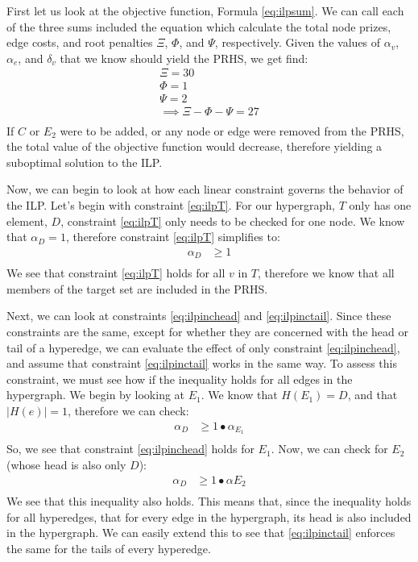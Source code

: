 \documentclass[12pt,twoside]{reedthesis}
\theoremstyle{definition}
\begin{document}
First let us look at the objective function, Formula \eqref{eq:ilpsum}. We can call each of the three sums included the equation which calculate the total node prizes, edge costs, and root penalties $\Xi$, $\Phi$, and $\Psi$, respectively. Given the values of $\alpha_v$, $\alpha_e$, and $\delta_v$ that we know should yield the PRHS, we get find:
\begin{gather*}
 \Xi = 30\\
 \Phi = 1\\
 \Psi = 2\\
 \implies \Xi - \Phi - \Psi = 27\\
\end{gather*}%
If $C$ or $E_2$ were to be added, or any node or edge were removed from the PRHS, the total value of the objective function would decrease, therefore yielding a suboptimal solution to the ILP.\par

Now, we can begin to look at how each linear constraint governs the behavior of the ILP. Let's begin with constraint \eqref{eq:ilpT}. For our hypergraph, $T$ only has one element, $D$, constraint \eqref{eq:ilpT} only needs to be checked for one node. We know that $\alpha_D = 1$, therefore constraint \eqref{eq:ilpT} simplifies to:
\begin{align*}
  \alpha_D &\geq 1\\
\end{align*}
We see that constraint \eqref{eq:ilpT} holds for all $v$ in $T$, therefore we know that all members of the target set are included in the PRHS.\par

Next, we can look at constraints \eqref{eq:ilpinchead} and \eqref{eq:ilpinctail}. Since these constraints are the same, except for whether they are concerned with the head or tail of a hyperedge, we can evaluate the effect of only constraint \eqref{eq:ilpinchead}, and assume that constraint \eqref{eq:ilpinctail} works in the same way. To assess this constraint, we must see how if the inequality holds for all edges in the hypergraph. We begin by looking at $E_1$. We know that $H({E_1})=D$, and that $\lvert H(e) \rvert = 1$, therefore we can check:
\begin{align*}
  \alpha_D &\geq 1 \bullet \alpha_{E_1}\\
\end{align*}%
So, we see that constraint \eqref{eq:ilpinchead} holds for $E_1$. Now, we can check for $E_2$ (whose head is also only $D$):
\begin{align*}
  \alpha_D &\geq 1 \bullet \alpha{E_2}\\
\end{align*}%
We see that this inequality also holds. This means that, since the inequality holds for all hyperedges, that for every edge in the hypergraph, its head is also included in the hypergraph. We can easily extend this to see that \eqref{eq:ilpinctail} enforces the same for the tails of every hyperedge.\par
\end{document}
